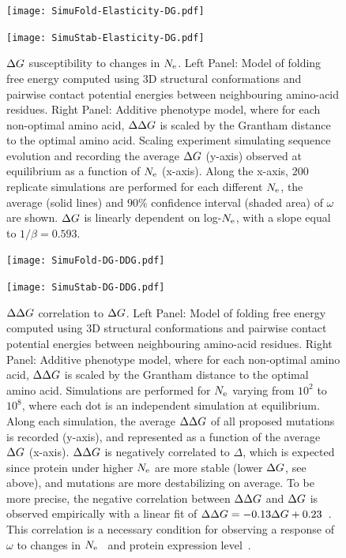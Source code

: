 \begin{figure}[H]
    \centering
    \begin{minipage}{0.49\linewidth}
        \texttt{[image: SimuFold-Elasticity-DG.pdf]}
    \end{minipage}%
    \hfill
    \begin{minipage}{0.49\linewidth}
        \texttt{[image: SimuStab-Elasticity-DG.pdf]}
    \end{minipage}
    \caption[$\DeltaG$ susceptibility to changes in $\Ne$]{
    $\DeltaG$ susceptibility to changes in $\Ne$.
    Left Panel: Model of folding free energy computed using 3D structural conformations and pairwise contact potential energies between neighbouring amino-acid residues.
    Right Panel: Additive phenotype model, where for each non-optimal amino acid, $\Delta \Delta G$ is scaled by the Grantham distance to the optimal amino acid.
    Scaling experiment simulating sequence evolution and recording the average $\DeltaG$ (y-axis) observed at equilibrium as a function of $\Ne$ (x-axis).
    Along the x-axis, $200$ replicate simulations are performed for each different $\Ne$, the average (solid lines) and $90\%$ confidence interval (shaded area) of $\omega$ are shown.
    $\DeltaG$ is linearly dependent on log-$\Ne$, with a slope equal to $1/\beta=0.593$.
    }
\end{figure}

\begin{figure}[H]
    \centering
    \begin{minipage}{0.49\linewidth}
        \texttt{[image: SimuFold-DG-DDG.pdf]}
    \end{minipage}%
    \hfill
    \begin{minipage}{0.49\linewidth}
        \texttt{[image: SimuStab-DG-DDG.pdf]}
    \end{minipage}

    \caption[$\EmpiricalDeltaDeltaG$ correlation to $\DeltaG$]{
    $\EmpiricalDeltaDeltaG$ correlation to $\DeltaG$.
    Left Panel: Model of folding free energy computed using 3D structural conformations and pairwise contact potential energies between neighbouring amino-acid residues.
    Right Panel: Additive phenotype model, where for each non-optimal amino acid, $\Delta \Delta G$ is scaled by the Grantham distance to the optimal amino acid.
    Simulations are performed for $\Ne$ varying from $10^2$ to $10^8$, where each dot is an independent simulation at equilibrium.
    Along each simulation, the average $\EmpiricalDeltaDeltaG$ of all proposed mutations is recorded (y-axis), and represented as a function of the average $\DeltaG$ (x-axis).
    $\EmpiricalDeltaDeltaG$ is negatively correlated to $\Delta$, which is expected since protein under higher $\Ne$ are more stable (lower $\DeltaG$, see above), and mutations are more destabilizing on average.
    To be more precise, the negative correlation between $\EmpiricalDeltaDeltaG$ and $\DeltaG$ is observed empirically with a linear fit of $\Delta \Delta G = -0.13\Delta G + 0.23$~\citep{Serohijos2012}.
    This correlation is a necessary condition for observing a response of $\omega$ to changes in $\Ne$~\citep{Goldstein2013} and protein expression level~\citep{Serohijos2012}.
    }
    \label{fig:DG-vs-DDG}
\end{figure}


